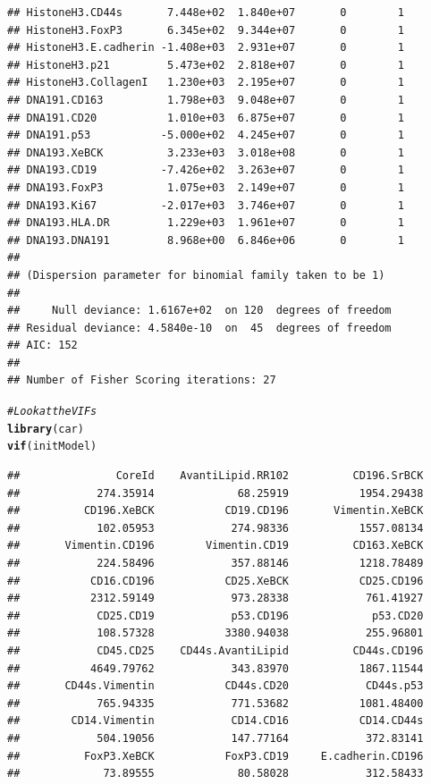\documentclass[a4paper]{article}\usepackage[]{graphicx}\usepackage[]{color}
\makeatletter
\newcommand{\hlcom}[1]{\textcolor[rgb]{0.678,0.584,0.686}{\textit{#1}}}%
\newcommand{\hlstd}[1]{\textcolor[rgb]{0.345,0.345,0.345}{#1}}%
\newcommand{\hlkwd}[1]{\textcolor[rgb]{0.737,0.353,0.396}{\textbf{#1}}}%
\newenvironment{kframe}{%
 \def\at@end@of@kframe{}%
 \ifinner\ifhmode%
  \def\at@end@of@kframe{\end{minipage}}%
  \begin{minipage}{\columnwidth}%
 \fi\fi%
 \def\FrameCommand##1{\hskip\@totalleftmargin \hskip-\fboxsep
 \colorbox{shadecolor}{##1}\hskip-\fboxsep
     \hskip-\linewidth \hskip-\@totalleftmargin \hskip\columnwidth}%
 \MakeFramed {\advance\hsize-\width
   \@totalleftmargin\z@ \linewidth\hsize
   \@setminipage}}%
 {\par\unskip\endMakeFramed%
 \at@end@of@kframe}
\newenvironment{knitrout}{}{} %
\makeatother
\begin{document}
\begin{knitrout}
\begin{kframe}
\begin{verbatim}
## HistoneH3.CD44s       7.448e+02  1.840e+07       0        1
## HistoneH3.FoxP3       6.345e+02  9.344e+07       0        1
## HistoneH3.E.cadherin -1.408e+03  2.931e+07       0        1
## HistoneH3.p21         5.473e+02  2.818e+07       0        1
## HistoneH3.CollagenI   1.230e+03  2.195e+07       0        1
## DNA191.CD163          1.798e+03  9.048e+07       0        1
## DNA191.CD20           1.010e+03  6.875e+07       0        1
## DNA191.p53           -5.000e+02  4.245e+07       0        1
## DNA193.XeBCK          3.233e+03  3.018e+08       0        1
## DNA193.CD19          -7.426e+02  3.263e+07       0        1
## DNA193.FoxP3          1.075e+03  2.149e+07       0        1
## DNA193.Ki67          -2.017e+03  3.746e+07       0        1
## DNA193.HLA.DR         1.229e+03  1.961e+07       0        1
## DNA193.DNA191         8.968e+00  6.846e+06       0        1
## 
## (Dispersion parameter for binomial family taken to be 1)
## 
##     Null deviance: 1.6167e+02  on 120  degrees of freedom
## Residual deviance: 4.5840e-10  on  45  degrees of freedom
## AIC: 152
## 
## Number of Fisher Scoring iterations: 27
\end{verbatim}
\begin{alltt}
\hlcom{# Look at the VIFs}
\hlkwd{library}\hlstd{(car)}
\hlkwd{vif}\hlstd{(initModel)}
\end{alltt}
\begin{verbatim}
##               CoreId    AvantiLipid.RR102          CD196.SrBCK 
##            274.35914             68.25919           1954.29438 
##          CD196.XeBCK           CD19.CD196       Vimentin.XeBCK 
##            102.05953            274.98336           1557.08134 
##       Vimentin.CD196        Vimentin.CD19          CD163.XeBCK 
##            224.58496            357.88146           1218.78489 
##           CD16.CD196           CD25.XeBCK           CD25.CD196 
##           2312.59149            973.28338            761.41927 
##            CD25.CD19            p53.CD196             p53.CD20 
##            108.57328           3380.94038            255.96801 
##            CD45.CD25    CD44s.AvantiLipid          CD44s.CD196 
##           4649.79762            343.83970           1867.11544 
##       CD44s.Vimentin           CD44s.CD20            CD44s.p53 
##            765.94335            771.53682           1081.48400 
##        CD14.Vimentin            CD14.CD16           CD14.CD44s 
##            504.19056            147.77164            372.83141 
##          FoxP3.XeBCK           FoxP3.CD19     E.cadherin.CD196 
##             73.89555             80.58028            312.58433 

\end{verbatim}
\end{kframe}
\end{knitrout}
\end{document}
